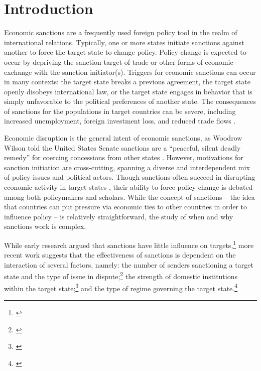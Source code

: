 \section*{Introduction}
\label{intro}

Economic sanctions are a frequently used foreign policy tool in the realm of international relations. Typically, one or more states initiate sanctions against another to force the target state to change policy. Policy change is expected to occur by depriving the sanction target of trade or other forms of economic exchange with the sanction initiator(s). Triggers for economic sanctions can occur in many contexts: the target state breaks a previous agreement, the target state openly disobeys international law, or the target state engages in behavior that is simply unfavorable to the political preferences of another state. The consequences of sanctions for the populations in target countries can be severe, including increased unemployment, foreign investment loss, and reduced trade flows \citep{hufbauer2003impact,hufbauer1997us}. 

Economic disruption is the general intent of economic sanctions, as Woodrow Wilson told the United States Senate sanctions are a ``peaceful, silent deadly remedy'' for coercing concessions from other states \citep{foley23}. However, motivations for sanction initiation are cross-cutting, spanning a diverse and interdependent mix of policy issues and political actors. Though sanctions often succeed in disrupting economic activity in target states \citep{escriba2010dealing}, their ability to force policy change is debated among both policymakers and scholars.  While the concept of sanctions -- the idea that countries can put pressure via economic ties to other countries in order to influence policy -- is relatively straightforward, the study of when and why sanctions work is complex.

While early research argued that sanctions have little influence on targets,\footnote{\cite{lam1990, dashti1997, morgan1997, drezner1998}} more recent work suggests that the effectiveness of sanctions is dependent on the interaction of several factors, namely: the number of senders sanctioning a target state and the type of issue in dispute;\footnote{\cite{miers2002, morgan2009threat}} the strength of domestic institutions within the target state;\footnote{\cite{dashti1997,marinov2005}} and the type of regime governing the target state.\footnote{\cite{mcgillivray2004,lektzian2007,allen2008domestic}} 

